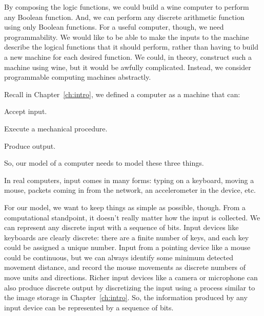 \begin{schemeregion}
By composing the logic functions, we could build a wine computer to perform any Boolean function.  And, we can perform any discrete arithmetic function using only Boolean functions.  For a useful computer, though, we need programmability.  We would like to be able to make the inputs to the machine describe the logical functions that it should perform, rather than having to build a new machine for each desired function.  We could, in theory, construct such a machine using wine, but it would be awfully complicated.  Instead, we consider programmable computing machines abstractly. 

Recall in Chapter~\ref{ch:intro}, we defined a computer as a machine that can:
\begin{enumtight}
\item Accept input.  
\item Execute a mechanical procedure. 
\item Produce output.
\end{enumtight}
So, our model of a computer needs to model these three things.  

 In real computers, input comes in many forms: typing on a keyboard, moving a mouse, packets coming in from the network, an accelerometer in the device, etc.  


For our model, we want to keep things as simple as possible, though.  From a computational standpoint, it doesn't really matter how the input is collected.  We can represent any discrete input with a sequence of bits.  Input devices like keyboards are clearly discrete: there are a finite number of keys, and each key could be assigned a unique number.  Input from a pointing device like a mouse could be continuous, but we can always identify some minimum detected movement distance, and record the mouse movements as discrete numbers of move units and directions.  Richer input devices like a camera or microphone can also produce discrete output by discretizing the input using a process similar to the image storage in Chapter~\ref{ch:intro}.  So, the information produced by any input device can be represented by a sequence of bits.  


\end{schemeregion}
